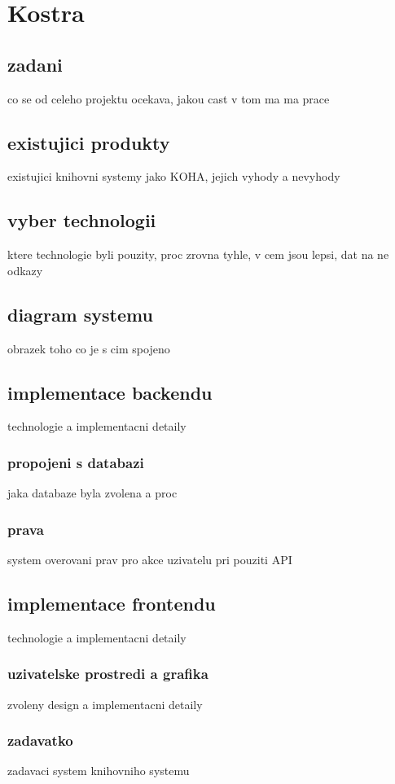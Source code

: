 \chapter*{Kostra}

\section{zadani}
co se od celeho projektu ocekava, jakou cast v tom ma ma prace

\section{existujici produkty}
existujici knihovni systemy jako KOHA, jejich vyhody a nevyhody

\section{vyber technologii}
ktere technologie byli pouzity, proc zrovna tyhle, v cem jsou lepsi, dat na ne odkazy

\section{diagram systemu}
obrazek toho co je s cim spojeno

\section{implementace backendu}
technologie a implementacni detaily
\subsection{propojeni s databazi}
jaka databaze byla zvolena a proc
\subsection{prava}
system overovani prav pro akce uzivatelu pri pouziti API

\section{implementace frontendu}
technologie a implementacni detaily
\subsection{uzivatelske prostredi a grafika}
zvoleny design a implementacni detaily
\subsection{zadavatko}
zadavaci system knihovniho systemu
